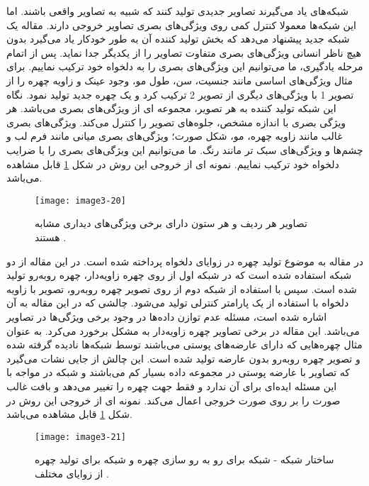\noindent
شبکه‌های  یاد می‌گیرند تصاویر جدیدی تولید کنند که شبیه به تصاویر واقعی باشند. اما این شبکه‌ها معمولا کنترل کمی روی ویژگی‌های بصری تصاویر خروجی دارند. مقاله \cite{karras2019stylebased} یک شبکه  جدید پیشنهاد می‌دهد که بخش تولید کننده آن به طور خودکار یاد می‌گیرد بدون هیچ ناظر انسانی ویژگی‌های بصری متفاوت تصاویر را از یکدیگر جدا نماید. پس از اتمام مرحله یادگیری، ما می‌توانیم این ویژگی‌های بصری را به دلخواه خود ترکیب نماییم. برای مثال ویژگی‌های اساسی مانند جنسیت، سن، طول مو، وجود عینک و زاویه چهره را از تصویر 1 با ویژگی‌های دیگری از تصویر 2 ترکیب کرد و یک چهره جدید تولید نمود. نگاه این شبکه تولید کننده به هر تصویر، مجموعه ای از ویژگی‌های بصری می‌باشد. هر ویژگی بصری با اندازه مشخص، جلوه‌های تصویر را کنترل می‌کند. ویژگی‌های بصری غالب مانند زاویه چهره، مو، شکل صورت؛ ویژگی‌های بصری میانی مانند فرم لب و چشم‌ها و ویژگی‌های سبک تر مانند رنگ. ما می‌توانیم این ویژگی‌های بصری را با ضرایب دلخواه خود ترکیب نماییم. نمونه ای از خروجی این روش در شکل \ref{image3-20} قابل مشاهده می‌باشد.
 
\begin{figure}[h]
\centering
  \texttt{[image: image3-20]}
  \caption{
تصاویر هر ردیف و هر ستون دارای برخی ویژگی‌های دیداری مشابه هستند 
  \cite{karras2019stylebased}.}
  \label{image3-20}
\end{figure}

\noindent
در مقاله \cite{8603840} به موضوع تولید چهره در زوایای دلخواه پرداخته شده است. در این مقاله از دو شبکه  استفاده شده است که در شبکه اول از روی چهره زاویه‌دار، چهره روبه‌رو تولید شده است. سپس با استفاده از شبکه  دوم از روی تصویر چهره روبه‌رو، تصویر با زاویه دلخواه با استفاده از یک پارامتر کنترلی تولید می‌شود. چالشی که در این مقاله به آن اشاره شده است، مسئله عدم توازن داده‌ها در وجود برخی ویژگی‌ها در تصاویر می‌باشد. این مقاله در برخی تصاویر چهره زاویه‌دار به مشکل برخورد می‌کرد. به عنوان مثال چهره‌هایی که دارای عارضه‌های پوستی می‌باشند توسط شبکه‌ها نادیده گرفته شده و تصویر چهره روبه‌رو بدون عارضه تولید شده است. این چالش از جایی نشات می‌گیرد که تصاویر با عارضه پوستی در مجموعه داده بسیار کم می‌باشند و شبکه در مواجه با این مسئله ایده‌ای برای آن ندارد و فقط جهت چهره را تغییر می‌دهد و بافت غالب صورت را بر روی صورت خروجی اعمال می‌کند. نمونه ای از خروجی این روش در شکل \ref{image3-20} قابل مشاهده می‌باشد.

\begin{figure}[h]
\centering
  \texttt{[image: image3-21]}
  \caption{ساختار شبکه  - شبکه  برای رو به رو سازی چهره و شبکه  برای تولید چهره از زوایای مختلف \cite{8603840}.}
  \label{image3-21}
\end{figure}
 
